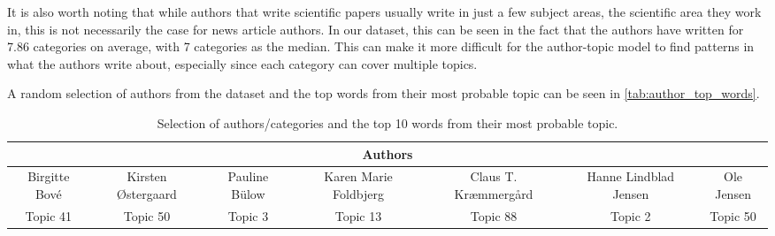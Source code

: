 It is also worth noting that while authors that write scientific papers usually write in just a few subject areas, the scientific area they work in, this is not necessarily the case for news article authors.
In our dataset, this can be seen in the fact that the authors have written for 7.86 categories on average, with 7 categories as the median.
This can make it more difficult for the author-topic model to find patterns in what the authors write about, especially since each category can cover multiple topics.

A random selection of authors from the dataset and the top words from their most probable topic can be seen in \autoref{tab:author_top_words}.

\begin{table*}[h]
	\centering
	\caption{Selection of authors/categories and the top 10 words from their most probable topic.}
	\begin{tabular}{c|c|c|c|c|c|c}
		\toprule
		\multicolumn{7}{c}{Authors} \\
		\midrule
		Birgitte Bové & Kirsten Østergaard & Pauline Bülow & Karen Marie Foldbjerg & Claus T. Kræmmergård & Hanne Lindblad Jensen & Ole Jensen \\
		\midrule
		Topic 41 & Topic 50 & Topic 3 & Topic 13 & Topic 88 & Topic 2 & Topic 50 \\
		\midrule

\end{tabular}
\end{table*}
